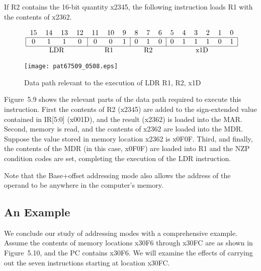 \documentclass{patt}
\begin{document}
If R2 contains the 16-bit quantity x2345, the following instruction
loads R1 with the contents of x2362.

\begin{equation*}
\mbox{\renewcommand{\tabcolsep}{6pt}
\begin{tabular}{cccccccccccccccc}
15 & 14 & 13 & 12 & 11 & 10 & 9 & 8 & 7 & 6 & 5 & 4 & 3 & 2 & 1 & 0\\
\hline
\multicolumn{1}{|c}{0}&\multicolumn{1}{c}{1}&
\multicolumn{1}{c}{1}&\multicolumn{1}{c}{0}&
\multicolumn{1}{|c}{0}&\multicolumn{1}{c}{0}&
\multicolumn{1}{c}{1}&\multicolumn{1}{|c}{0}&
\multicolumn{1}{c}{1}&\multicolumn{1}{c}{0}&
\multicolumn{1}{|c}{0}&\multicolumn{1}{c}{1}&
\multicolumn{1}{c}{1}&\multicolumn{1}{c}{1}&
\multicolumn{1}{c}{0}&\multicolumn{1}{c|}{1}\\
\hline
\multicolumn{4}{c}{LDR} &\multicolumn{3}{c}{R1} &
\multicolumn{3}{c}{R2} &\multicolumn{6}{c}{x1D} \\
\end{tabular}}
\end{equation*}


\begin{figure}[b]
\centerline{\texttt{[image: pat67509\_0508.eps]}}
\caption{Data path relevant to the execution of LDR R1, R2, x1D}
\end{figure}


Figure~5.9 shows the relevant parts of the data path required to execute
this instruction. First the contents of R2 (x2345) are added to the
sign-extended value contained in IR[5:0] (x001D), and the result (x2362)
is loaded into the MAR. Second, memory is read, and the contents of x2362 are
loaded into the MDR. Suppose the value stored in memory location x2362 is x0F0F.
Third, and finally, the contents of the MDR (in this case, x0F0F) are 
loaded into R1 and the NZP condition codes are set, completing the execution
of the LDR instruction.

Note that the Base+offset addressing mode also allows the
address of the operand to be anywhere in the computer's memory.

\FloatBarrier
\subsection{An Example}

We conclude our study of addressing modes with a
comprehensive example. Assume the contents of memory locations
x30F6 through x30FC are as shown in Figure~5.10, and the PC
contains x30F6. We will examine the effects of carrying out
the seven instructions starting at location x30FC.
\end{document}
